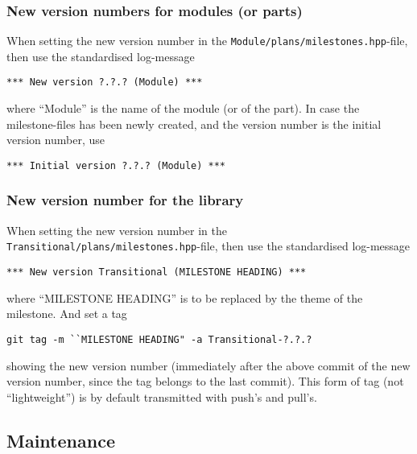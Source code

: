 \documentclass{book}
\newcommand{\filename}[1]{\texttt{#1}}
\begin{document}
\subsubsection{New version numbers for modules (or parts)}
\label{sec:GitSpecialeventsTransitionsmodules}

When setting the new version number in the \filename{Module/plans/milestones.hpp}-file, then use the standardised log-message
\begin{verbatim}
*** New version ?.?.? (Module) ***
\end{verbatim}
where ``Module'' is the name of the module (or of the part). In case the milestone-files has been newly created, and the version number is the initial version number, use
\begin{verbatim}
*** Initial version ?.?.? (Module) ***
\end{verbatim}




\subsubsection{New version number for the library}
\label{sec:GitSpecialeventsNewversionlibrary}

When setting the new version number in the \filename{Transitional/plans/milestones.hpp}-file, then use the standardised log-message
\begin{verbatim}
*** New version Transitional (MILESTONE HEADING) ***
\end{verbatim}
where ``MILESTONE HEADING'' is to be replaced by the theme of the milestone. And set a tag
\begin{verbatim}
git tag -m ``MILESTONE HEADING" -a Transitional-?.?.?
\end{verbatim}
showing the new version number (immediately after the above commit of the new version number, since the tag belongs to the last commit). This form of tag (not ``lightweight'') is by default transmitted with push's and pull's.







\subsection{Maintenance}
\label{sec:GitMaintenance}
\end{document}
